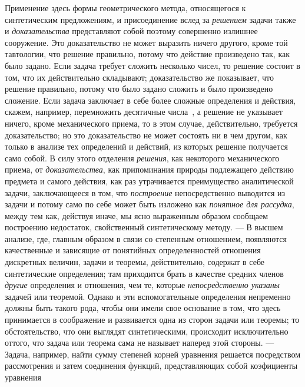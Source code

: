 \documentclass[twoside]{article}
\begin{document}
{Применение здесь формы геометрического метода, относящегося к
синтетическим предложениям, и присоединение вслед за
{\em решением} задачи
также и {\em доказательства}
представляют собой поэтому совершенно излишнее сооружение.
Это доказательство не может выразить ничего другого, кроме той тавтологии,
что решение правильно, потому что действие произведено так, как было
задано. Если задача требует сложить несколько чисел, то решение состоит в
том, что их действительно складывают; доказательство же показывает, что
решение правильно, потому что было задано сложить и было произведено
сложение. Если задача заключает в себе более сложные определения и
действия, скажем, например, перемножить десятичные
числа~\label{bkm:bm103},
а решение не указывает ничего, кроме механического приема, то
в этом случае, действительно, требуется доказательство; но это
доказательство не может состоять ни в чем другом, как только в анализе тех
определений и действий, из которых решение получается само собой. В силу
этого отделения {\em решения},
как некоторого механического приема, от
{\em доказательства}, как
припоминания природы подлежащего действию предмета и самого действия, как
раз утрачивается преимущество аналитической задачи, заключающееся в том,
что {\em построение}
непосредственно выводится из задачи и потому само по себе
может быть изложено как {\em понятное
для рассудка}, между тем как, действуя иначе, мы ясно
выраженным образом сообщаем построению недостаток, свойственный
синтетическому методу. — В высшем анализе, где, главным
образом в связи со степенным отношением, появляются качественные и
зависящие от понятийных определенностей отношения дискретных величин,
задачи и теоремы, действительно, содержат в себе синтетические определения;
там приходится брать в качестве средних членов
{\em другие} определения
и отношения, чем те, которые
{\em непосредственно указаны}
задачей или теоремой. Однако и эти вспомогательные
определения непременно должны быть такого рода, чтобы они имели свое
основание в том, что здесь принимается в соображение и развивается одна из
сторон задачи или теоремы; то обстоятельство, что они выглядят
синтетическими, происходит исключительно оттого, что задача или теорема
сама не называет наперед этой стороны. — Задача, например,
найти сумму степеней корней уравнения решается посредством рассмотрения и
затем соединения функций, представляющих собой коэфициенты уравнения
}
\end{document}
